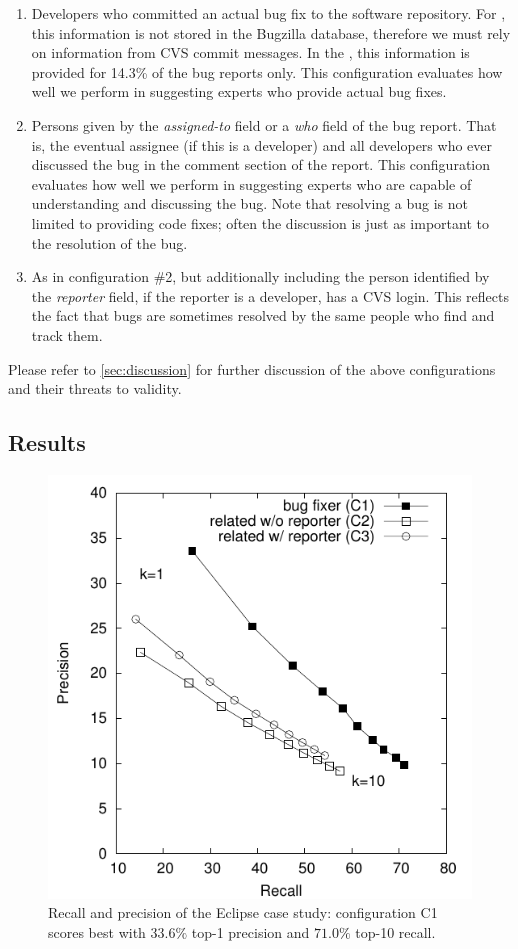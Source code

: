 \begin{enumerate}
\item Developers who committed an actual bug fix to the software repository. For \EC, this information is not stored in the Bugzilla database, therefore we must rely on information from CVS commit messages. In the \validationset, this information is provided for 14.3\% of the bug reports only. This configuration evaluates how well we perform in suggesting experts who provide actual bug fixes.
\item Persons given by the \emph{assigned-to} field or a \emph{who} field of the bug report. That is, the eventual assignee (if this is a developer) and all developers who ever discussed the bug in the comment section of the report. This configuration evaluates how well we perform in suggesting experts who are capable of understanding and discussing the bug. Note that resolving a bug is not limited to providing code fixes; often the discussion is just as important to the resolution of the bug. 
\item As in configuration \#2, but additionally including the person identified by the \emph{reporter} field, if the reporter is a developer, \ie has a CVS login. This reflects the fact that bugs are sometimes resolved by the same people who find and track them.
\end{enumerate}

Please refer to \autoref{sec:discussion} for further discussion of the above configurations and their threats to validity.

\subsection{Results}\label{therealthing}

\begin{figure}
	\center
    \includegraphics[width=0.61\linewidth]{fig/devlect-test-set}
    \caption{Recall and precision of the Eclipse case study: configuration C1 scores best with $33.6\%$ top-1 precision and $71.0\%$ top-10 recall.}
    \label{fig:eclipse}
\end{figure} 

